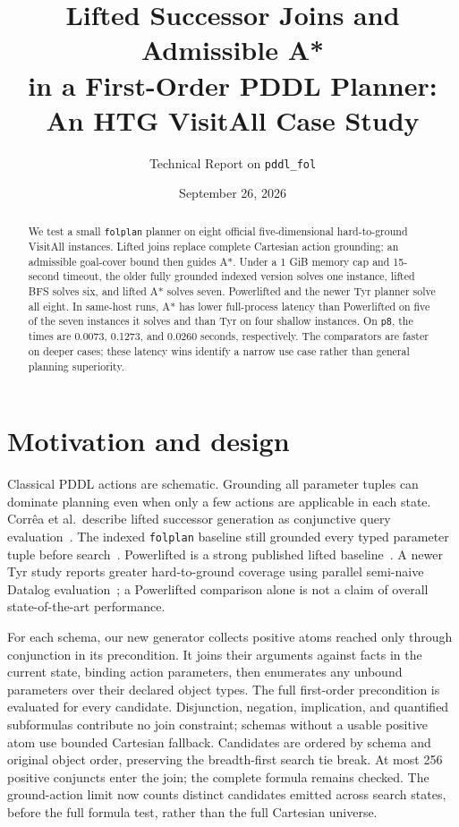 \documentclass[10pt,a4paper]{article}
\title{Lifted Successor Joins and Admissible A*\\
in a First-Order PDDL Planner: An HTG VisitAll Case Study}
\author{Technical Report on \texttt{pddl\_fol}}
\date{September 26, 2026}
\begin{document}
\maketitle

\begin{abstract}
We test a small \texttt{folplan} planner on eight official five-dimensional
hard-to-ground VisitAll instances. Lifted joins replace complete Cartesian
action grounding; an admissible goal-cover bound then guides A*. Under a 1 GiB
memory cap and 15-second timeout, the older fully grounded indexed version
solves one instance, lifted BFS solves six, and lifted A* solves seven.
Powerlifted and the newer Tyr planner solve all eight. In same-host runs,
A* has lower full-process latency than Powerlifted on five of the seven
instances it solves and than Tyr on four shallow instances. On \texttt{p8},
the times are 0.0073, 0.1273, and 0.0260 seconds, respectively. The
comparators are faster on deeper cases; these latency wins identify a
narrow use case rather than general planning superiority.
\end{abstract}

\section{Motivation and design}
Classical PDDL actions are schematic. Grounding all parameter tuples can
dominate planning even when only a few actions are applicable in each state.
Corr\^ea et al.\ describe lifted successor generation as conjunctive query
evaluation~\cite{correa2020}. The indexed \texttt{folplan} baseline still
grounded every typed parameter tuple before search~\cite{priorstudy}.
Powerlifted is a strong published lifted baseline~\cite{powerlifted}. A newer
Tyr study reports greater hard-to-ground coverage using parallel semi-naive
Datalog evaluation~\cite{tyr2026}; a Powerlifted comparison alone is not a
claim of overall state-of-the-art performance.

For each schema, our new generator collects positive atoms reached only
through conjunction in its precondition. It joins their arguments against
facts in the current state, binding action parameters, then enumerates any
unbound parameters over their declared object types. The full first-order
precondition is evaluated for every candidate. Disjunction, negation,
implication, and quantified subformulas contribute no join constraint;
schemas without a usable positive atom use bounded Cartesian fallback.
Candidates are ordered by schema and original object order, preserving the
breadth-first search tie break. At most 256 positive conjuncts enter the
join; the complete formula remains checked. The ground-action limit now
counts distinct candidates emitted across search states, before the full
formula test, rather than the full Cartesian universe.
\end{document}
